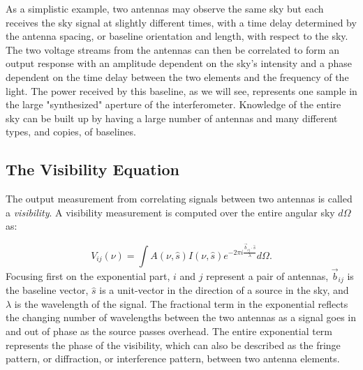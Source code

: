 As a simplistic example, two antennas may observe the same sky but each receives the sky signal at slightly different times, with a time delay determined by the antenna spacing, or baseline orientation and length, with respect to the sky. The two voltage streams from the antennas can then be correlated to form an output response with an amplitude dependent on the sky's intensity and a phase dependent on the time delay between the two elements and the frequency of the light. The power received by this baseline, as we will see, represents one sample in the large "synthesized" aperture of the interferometer. Knowledge of the entire sky can be built up by having a large number of antennas and many different types, and copies, of baselines.

\subsection{The Visibility Equation}

The output measurement from correlating signals between two antennas is called a \textit{visibility}. A visibility measurement is computed over the entire angular sky $d\Omega$ as:



\begin{equation}
\label{eq:vis}
V_{ij}(\nu) = \int A(\nu,\hat{s})I(\nu,\hat{s}) e^{-2\pi i\frac{\vec{b}_{ij} \cdot \hat{s}}{\lambda}}d\Omega.
\end{equation}
Focusing first on the exponential part, $i$ and $j$ represent a pair of antennas, $\vec{b}_{ij}$ is the baseline vector, $\hat{s}$ is a unit-vector in the direction of a source in the sky, and $\lambda$ is the wavelength of the signal. The fractional term in the exponential reflects the changing number of wavelengths between the two antennas as a signal goes in and out of phase as the source passes overhead. The entire exponential term represents the phase of the visibility, which can also be described as the fringe pattern, or diffraction, or interference pattern, between two antenna elements.


